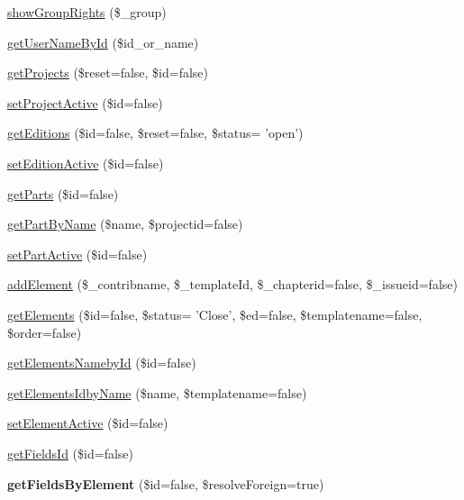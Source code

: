 \begin{DoxyCompactItemize}
\item 
\hyperlink{classrokfor___d_b_a42c7e6a04c4267bf7ca00c8da1cbdcf5}{show\-Group\-Rights} (\$\-\_\-group)
\item 
\hyperlink{classrokfor___d_b_aaa31c3bd4f2160cdb031853f0a1f98df}{get\-User\-Name\-By\-Id} (\$id\-\_\-or\-\_\-name)
\item 
\hyperlink{classrokfor___d_b_ae9befc7da9622522b92e7166b344dc66}{get\-Projects} (\$reset=false, \$id=false)
\item 
\hyperlink{classrokfor___d_b_a9320d2593446e4bdc803b20d47c7b36e}{set\-Project\-Active} (\$id=false)
\item 
\hyperlink{classrokfor___d_b_a79de8205e59144dd9ab03c7366a35e4c}{get\-Editions} (\$id=false, \$reset=false, \$status= 'open')
\item 
\hyperlink{classrokfor___d_b_a0bdff735b256d3d0b19de601d305a229}{set\-Edition\-Active} (\$id=false)
\item 
\hyperlink{classrokfor___d_b_a8770ff258a970263fc4f06095470195f}{get\-Parts} (\$id=false)
\item 
\hyperlink{classrokfor___d_b_a41f63552292422a28378289006da79e8}{get\-Part\-By\-Name} (\$name, \$projectid=false)
\item 
\hyperlink{classrokfor___d_b_a47a162a7645f67de4ff791ee16a62dc2}{set\-Part\-Active} (\$id=false)
\item 
\hyperlink{classrokfor___d_b_a8f00ab03c3a5c67d7a3dd43ee5ba5aa7}{add\-Element} (\$\-\_\-contribname, \$\-\_\-template\-Id, \$\-\_\-chapterid=false, \$\-\_\-issueid=false)
\item 
\hyperlink{classrokfor___d_b_ae3bdbe96ae91f4f4978f3c8e1ae1dcc3}{get\-Elements} (\$id=false, \$status= '\-Close', \$ed=false, \$templatename=false, \$order=false)
\item 
\hyperlink{classrokfor___d_b_ac783575e3c1c6f6327c44c3fa4d5dad0}{get\-Elements\-Nameby\-Id} (\$id=false)
\item 
\hyperlink{classrokfor___d_b_a30d11550e437374a50ecf9bcc684fd69}{get\-Elements\-Idby\-Name} (\$name, \$templatename=false)
\item 
\hyperlink{classrokfor___d_b_a3cca4c9f02cd1dcf760067584fc992f6}{set\-Element\-Active} (\$id=false)
\item 
\hyperlink{classrokfor___d_b_a360af4c0ba1d8fc85c6441a32dde9669}{get\-Fields\-Id} (\$id=false)
\item 
\hypertarget{classrokfor___d_b_abff514d4408439808c93f62b178ad8ec}{
{\bfseries get\-Fields\-By\-Element} (\$id=false, \$resolve\-Foreign=true)}
\label{classrokfor___d_b_abff514d4408439808c93f62b178ad8ec}


\end{DoxyCompactItemize}
